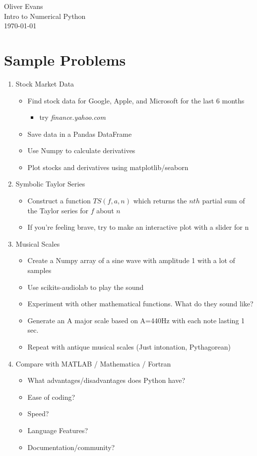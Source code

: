 \documentclass[letterpaper]{article}
\begin{document}
\noindent
Oliver Evans \\
Intro to Numerical Python \\
\today \\

\section{Sample Problems}
\begin{enumerate}
	\item Stock Market Data
	\begin{itemize}
		\item Find stock data for Google, Apple, and Microsoft for the last 6 months  
			\begin{itemize}
				\item try \textit{finance.yahoo.com}
			\end{itemize}
		\item Save data in a Pandas DataFrame
		\item Use Numpy to calculate derivatives
		\item Plot stocks and derivatives using matplotlib/seaborn
	\end{itemize}
\item Symbolic Taylor Series
	\begin{itemize}
		\item Construct a function $TS(f,a,n)$ which returns the $nth$ partial sum of the Taylor series for $f$ about $n$
		\item If you're feeling brave, try to make an interactive plot with a slider for n
	\end{itemize}

\item Musical Scales
	\begin{itemize}
		\item Create a Numpy array of a sine wave with amplitude 1 with a lot of samples
		\item Use scikits-audiolab to play the sound
		\item Experiment with other mathematical functions. What do they sound like?
		\item Generate an A major scale based on A=440Hz with each note lasting 1 sec.
		\item Repeat with antique musical scales (Just intonation, Pythagorean)
	\end{itemize}
    
\item Compare with MATLAB / Mathematica / Fortran
	\begin{itemize}
		\item What advantages/disadvantages does Python have?
		\item Ease of coding?
		\item Speed?
		\item Language Features?
		\item Documentation/community?
	\end{itemize}


\end{enumerate}
\end{document}
